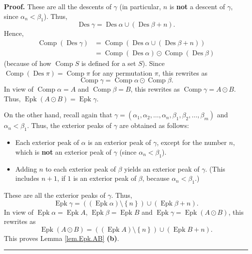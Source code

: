 \documentclass[numbers=enddot,12pt,final,onecolumn,notitlepage]{scrartcl}%
\theoremstyle{definition}
\newenvironment{proof}[1][Proof]{\noindent\textbf{#1.} }{\ \rule{0.5em}{0.5em}}
\newenvironment{verlong}{}{}
\begin{document}
\begin{verlong}
\begin{proof}
These are all the descents of $\gamma$ (in particular, $n$ is \textbf{not} a
descent of $\gamma$, since $\alpha_{n}<\beta_{1}$). Thus,%
\[
\operatorname{Des}\gamma=\operatorname{Des}\alpha\cup\left(
\operatorname{Des}\beta+n\right)  .
\]
Hence,%
\begin{align*}
\operatorname*{Comp}\left(  \operatorname{Des}\gamma\right)   &
=\operatorname*{Comp}\left(  \operatorname{Des}\alpha\cup\left(
\operatorname{Des}\beta+n\right)  \right) \\
&  =\operatorname*{Comp}\left(  \operatorname{Des}\alpha\right)
\odot\operatorname*{Comp}\left(  \operatorname{Des}\beta\right)
\end{align*}
(because of how $\operatorname*{Comp}S$ is defined for a set $S$). Since
$\operatorname*{Comp}\left(  \operatorname{Des}\pi\right)
=\operatorname*{Comp}\pi$ for any permutation $\pi$, this rewrites as%
\[
\operatorname*{Comp}\gamma=\operatorname*{Comp}\alpha\odot\operatorname*{Comp}%
\beta.
\]
In view of $\operatorname*{Comp}\alpha=A$ and $\operatorname*{Comp}\beta=B$,
this rewrites as $\operatorname*{Comp}\gamma=A\odot B$. Thus,
$\operatorname{Epk}\left(  A\odot B\right)  =\operatorname{Epk}\gamma$.

On the other hand, recall again that $\gamma=\left(  \alpha_{1},\alpha
_{2},\ldots,\alpha_{n},\beta_{1},\beta_{2},\ldots,\beta_{m}\right)  $ and
$\alpha_{n}<\beta_{1}$. Thus, the exterior peaks of $\gamma$ are obtained as follows:

\begin{itemize}
\item Each exterior peak of $\alpha$ is an exterior peak of $\gamma$, except
for the number $n$, which is \textbf{not} an exterior peak of $\gamma$ (since
$\alpha_{n}<\beta_{1}$).

\item Adding $n$ to each exterior peak of $\beta$ yields an exterior peak of
$\gamma$. (This includes $n+1$, if $1$ is an exterior peak of $\beta$, because
$\alpha_{n}<\beta_{1}$.)
\end{itemize}

These are all the exterior peaks of $\gamma$. Thus,%
\[
\operatorname{Epk}\gamma=\left(  \left(  \operatorname{Epk}\alpha\right)
\setminus\left\{  n\right\}  \right)  \cup\left(  \operatorname{Epk}%
\beta+n\right)  .
\]
In view of $\operatorname{Epk}\alpha=\operatorname{Epk}A$,
$\operatorname{Epk}\beta=\operatorname{Epk}B$ and $\operatorname{Epk}%
\gamma=\operatorname{Epk}\left(  A\odot B\right)  $, this rewrites as
\[
\operatorname{Epk}\left(  A\odot B\right)  =\left(  \left(
\operatorname{Epk}A\right)  \setminus\left\{  n\right\}  \right)  \cup\left(
\operatorname{Epk}B+n\right)  .
\]
This proves Lemma \ref{lem.Epk.AB} \textbf{(b)}.
\end{proof}


\end{verlong}
\end{document}
